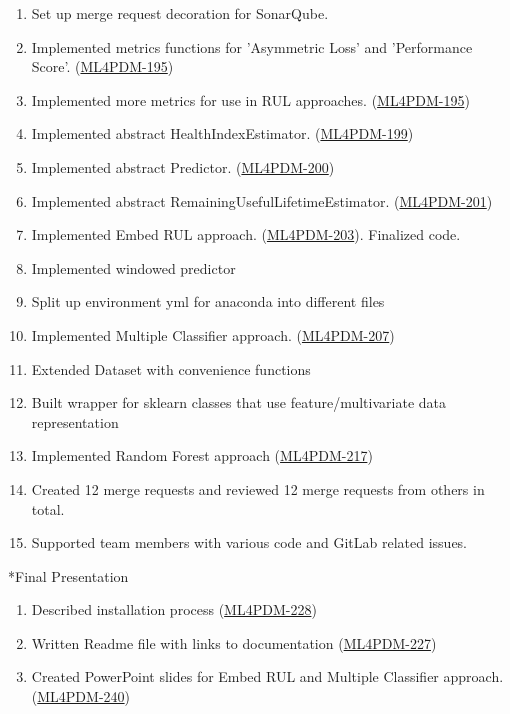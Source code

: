 \documentclass[11pt,a4paper]{article}
\begin{document}
\begin{section}
\begin{subsection}
\begin{enumerate}
     \item
           Set up merge request decoration for SonarQube.
     \item
           Implemented metrics functions for 'Asymmetric Loss' and 'Performance Score'. (\href{https://ml4pdm.atlassian.net/browse/ML4PDM-195}{ML4PDM-195})
     \item
           Implemented more metrics for use in RUL approaches. (\href{https://ml4pdm.atlassian.net/browse/ML4PDM-195}{ML4PDM-195})
     \item
           Implemented abstract HealthIndexEstimator. (\href{https://ml4pdm.atlassian.net/browse/ML4PDM-199}{ML4PDM-199})
     \item
           Implemented abstract Predictor. (\href{https://ml4pdm.atlassian.net/browse/ML4PDM-200}{ML4PDM-200})
     \item
           Implemented abstract RemainingUsefulLifetimeEstimator. (\href{https://ml4pdm.atlassian.net/browse/ML4PDM-201}{ML4PDM-201})
     \item
           Implemented Embed RUL approach. (\href{https://ml4pdm.atlassian.net/browse/ML4PDM-203}{ML4PDM-203}). Finalized code.
     \item
           Implemented windowed predictor
     \item
           Split up environment yml for anaconda into different files
     \item
           Implemented Multiple Classifier approach. (\href{https://ml4pdm.atlassian.net/browse/ML4PDM-207}{ML4PDM-207})
     \item
           Extended Dataset with convenience functions
     \item
           Built wrapper for sklearn classes that use feature/multivariate data representation
     \item
           Implemented Random Forest approach  (\href{https://ml4pdm.atlassian.net/browse/ML4PDM-217}{ML4PDM-217})
     \item
           Created 12 merge requests and reviewed 12 merge requests from others in total.
     \item
           Supported team members with various code and GitLab related issues.
   \end{enumerate}
 \end{subsection}
 \begin{subsection}*{Final Presentation}
   \begin{enumerate}
     \item
           Described installation process  (\href{https://ml4pdm.atlassian.net/browse/ML4PDM-228}{ML4PDM-228})
     \item
           Written Readme file with links to documentation (\href{https://ml4pdm.atlassian.net/browse/ML4PDM-227}{ML4PDM-227})
     \item
           Created PowerPoint slides for Embed RUL and Multiple Classifier approach. (\href{https://ml4pdm.atlassian.net/browse/ML4PDM-240}{ML4PDM-240})
   \end{enumerate}
 \end{subsection}
\end{section}
\end{document}
